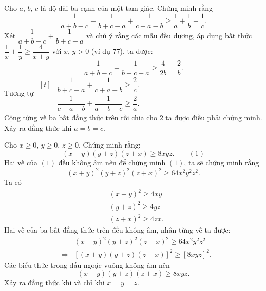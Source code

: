 \begin{vd}%
Cho $a$, $b$, $c$ là độ dài ba cạnh của một tam giác. Chứng minh rằng $$\dfrac{1}{a+b-c}+\dfrac{1}{b+c-a}+\dfrac{1}{c+a-b}\geq \dfrac{1}{a}+\dfrac{1}{b}+\dfrac{1}{c}.$$
	\loigiai
	{
		Xét $\dfrac{1}{a+b-c}+\dfrac{1}{b+c-a}$ và chú ý rằng các mẫu đều dương, áp dụng bất thức $\dfrac{1}{x}+\dfrac{1}{y}\geq \dfrac{4}{x+y}$ với $x,\, y>0$ (ví dụ $77$), ta được:
		$$\dfrac{1}{a+b-c}+\dfrac{1}{b+c-a}\geq \dfrac{4}{2b}=\dfrac{2}{b}.$$
		Tương tự $\begin{aligned}[t]
		&\dfrac{1}{b+c-a}+\dfrac{1}{c+a-b}\geq \dfrac{2}{c}.\\
		&\dfrac{1}{c+a-b}+\dfrac{1}{a+b-c}\geq \dfrac{2}{a}.
		\end{aligned}$\\
		Cộng từng vế ba bất đẳng thức trên rồi chia cho $2$ ta được điều phải chứng minh.\\
		Xảy ra đẳng thức khi $a=b=c$.
	}
\end{vd}
\begin{vd}%
	Cho $x\geq 0$, $y\geq 0$, $z\geq 0$. Chứng minh rằng:
	$$\left(x+y\right)\left(y+z\right)\left(z+x\right)\geq 8xyz.\quad\quad (1)$$
	\loigiai
	{
		Hai vế của $(1)$ đều không âm nên để chứng minh $(1)$, ta sẽ chứng minh rằng 
		$$\left(x+y\right)^2\left(y+z\right)^2\left(z+x\right)^2\geq 64x^2y^2z^2.$$
		Ta có \begin{align*}
		&\left(x+y\right)^2\geq 4xy\\
		&\left(y+z\right)^2\geq 4yz\\
		&\left(z+x\right)^2\geq 4zx.
		\end{align*}
		Hai vế của ba bất đẳng thức trên đều không âm, nhân từng vế ta được:
		\begin{eqnarray*}
			&&\left(x+y\right)^2\left(y+z\right)^2\left(z+x\right)^2\geq 64x^2y^2z^2\\
			&\Rightarrow& \left[\left(x+y\right)\left(y+z\right)\left(z+x\right)\right]^2\geq \left[8xyz\right]^2.
		\end{eqnarray*}
	Các biểu thức trong dấu ngoặc vuông không âm nên
	$$\left(x+y\right)\left(y+z\right)\left(z+x\right)\geq 8xyz.$$
	Xảy ra đẳng thức khi và chỉ khi $x=y=z$.
	}
\end{vd}
